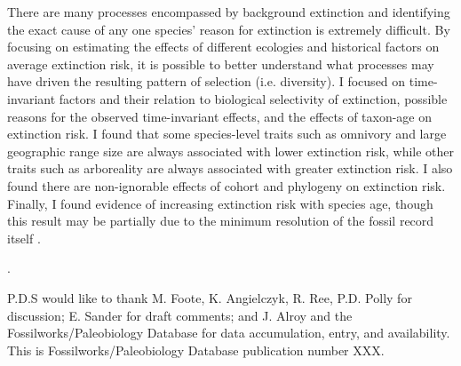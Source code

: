 \documentclass[12pt]{article}
\newcounter{lastnote}
\newenvironment{scilastnote}{%
\setcounter{lastnote}{\value{enumiv}}%
\addtocounter{lastnote}{+1}%
\begin{list}%
{\arabic{lastnote}.}
{\setlength{\leftmargin}{.22in}}
{\setlength{\labelsep}{.5em}}}
{\end{list}}
\begin{document}

There are many processes encompassed by background extinction and identifying the exact cause of any one species' reason for extinction is extremely difficult. By focusing on estimating the effects of different ecologies and historical factors on average extinction risk, it is possible to better understand what processes may have driven the resulting pattern of selection (i.e. diversity). I focused on time-invariant factors and their relation to biological selectivity of extinction, possible reasons for the observed time-invariant effects, and the effects of taxon-age on extinction risk. I found that some species-level traits such as omnivory and large geographic range size are always associated with lower extinction risk, while other traits such as arboreality are always associated with greater extinction risk. I also found there are non-ignorable effects of cohort and phylogeny on extinction risk. Finally, I found evidence of increasing extinction risk with species age, though this result may be partially due to the minimum resolution of the fossil record itself \cite{Sepkoski1975}.





\begin{scilastnote}
\item P.D.S would like to thank M. Foote, K. Angielczyk, R. Ree, P.D. Polly for discussion; E. Sander for draft comments; and J. Alroy and the Fossilworks/Paleobiology Database for data accumulation, entry, and availability. This is Fossilworks/Paleobiology Database publication number XXX.
\end{scilastnote}
\end{document}
